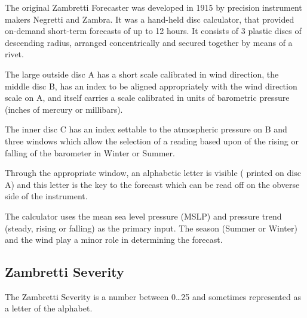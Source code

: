 
The original Zambretti Forecaster
was developed in 1915 by precision instrument makers Negretti and Zambra.
It was a hand-held disc calculator, that provided on-demand short-term forecasts of up to 12 hours.
It consists of 3 plastic discs of descending radius, arranged concentrically
and secured together by means of a rivet.

The large outside disc A has a short scale calibrated in wind direction,
the middle disc B, has an index to be aligned appropriately with the wind direction scale on A,
and itself carries a scale calibrated in units of barometric pressure (inches of mercury or millibars).

The inner disc C has an index settable to the atmospheric pressure on B and three windows which
allow the selection of a reading based upon of the rising or falling of the barometer in
Winter or Summer.

Through the appropriate window, an alphabetic letter is visible ( printed on disc A)
and this letter is the key to the forecast which can be read off on the obverse side of the instrument.

The calculator uses the mean sea level pressure (MSLP) and pressure trend (steady, rising or falling)
as the primary input.
The season (Summer or Winter) and the wind play a minor role in determining the forecast.

\subsection{Zambretti Severity}

The Zambretti Severity is a number between 0\ldots25 and sometimes represented as a letter of the alphabet.

